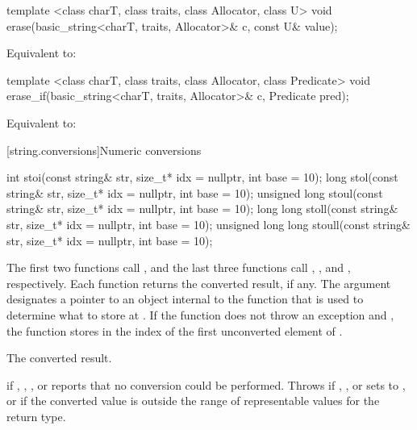 %
\begin{itemdecl}
template <class charT, class traits, class Allocator, class U>
  void erase(basic_string<charT, traits, Allocator>& c, const U& value);
\end{itemdecl}

\begin{itemdescr}
\pnum
\effects
Equivalent to: 
\end{itemdescr}

%
\begin{itemdecl}
template <class charT, class traits, class Allocator, class Predicate>
  void erase_if(basic_string<charT, traits, Allocator>& c, Predicate pred);
\end{itemdecl}

\begin{itemdescr}
\pnum
\effects
Equivalent to: 
\end{itemdescr}

[string.conversions]{Numeric conversions}

%
%
%
%
%
\begin{itemdecl}
int stoi(const string& str, size_t* idx = nullptr, int base = 10);
long stol(const string& str, size_t* idx = nullptr, int base = 10);
unsigned long stoul(const string& str, size_t* idx = nullptr, int base = 10);
long long stoll(const string& str, size_t* idx = nullptr, int base = 10);
unsigned long long stoull(const string& str, size_t* idx = nullptr, int base = 10);
\end{itemdecl}

\begin{itemdescr}
\pnum
\effects The first two functions call ,
and the last three functions call ,
, and , respectively. Each function returns the converted result, if any. The
argument  designates a pointer to an object internal to the function
that is used to determine what to store at . If the function does
not throw an exception and , the function stores in 
the index of the first unconverted element of .

\pnum
\returns The converted result.

\pnum
\throws {} if , ,
, or  reports that no conversion could be
performed. Throws  if , ,
 or  sets  to ,
or if the converted value is outside the range of representable values
for the return type.
\end{itemdescr}

